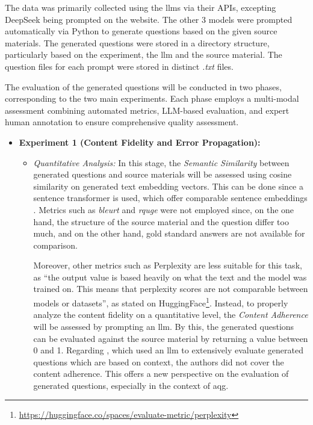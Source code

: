  The data was primarily collected using the \ac{llms} via their APIs, excepting DeepSeek being prompted on the website. The other 3 models were prompted automatically via Python to generate questions based on the given source materials. The generated questions were stored in a directory structure, particularly based on the experiment, the \ac{llm} and the source material. The question files for each prompt were stored in distinct \textit{.txt} files.

 The evaluation of the generated questions will be conducted in two phases, corresponding to the two main experiments. Each phase employs a multi-modal assessment combining automated metrics, LLM-based evaluation, and expert human annotation to ensure comprehensive quality assessment.
\begin{itemize}
    \item \textbf{Experiment 1 (Content Fidelity and Error Propagation):}
    \begin{itemize}
        \item \textit{Quantitative Analysis:} In this stage, the \textit{Semantic Similarity} between generated questions and source materials will be assessed using cosine similarity on generated text embedding vectors. This can be done since a sentence transformer is used, which offer comparable sentence embeddings \cite{reimers_sentence-bert_2019}. Metrics such as \textit{\ac{bleurt}} and \textit{\ac{rquge}} were not employed since, on the one hand, the structure of the source material and the question differ too much, and on the other hand, gold standard answers are not available for comparison.

        \pagebreak
        
        Moreover, other metrics such as Perplexity are less suitable for this task, as \enquote{the output value is based heavily on what the text and the model was trained on. This means that perplexity scores are not comparable between models or datasets}, as stated on HuggingFace\footnote{\url{https://huggingface.co/spaces/evaluate-metric/perplexity}}. Instead, to properly analyze the content fidelity on a quantitative level, the \textit{Content Adherence} will be assessed by prompting an \ac{llm}. By this, the generated questions can be evaluated against the source material by returning a value between 0 and 1. Regarding \cite{nguyen_reference-based_2024}, which used an \ac{llm} to extensively evaluate generated questions which are based on context, the authors did not cover the content adherence. This offers a new perspective on the evaluation of generated questions, especially in the context of \ac{aqg}.


\end{itemize}
\end{itemize}
